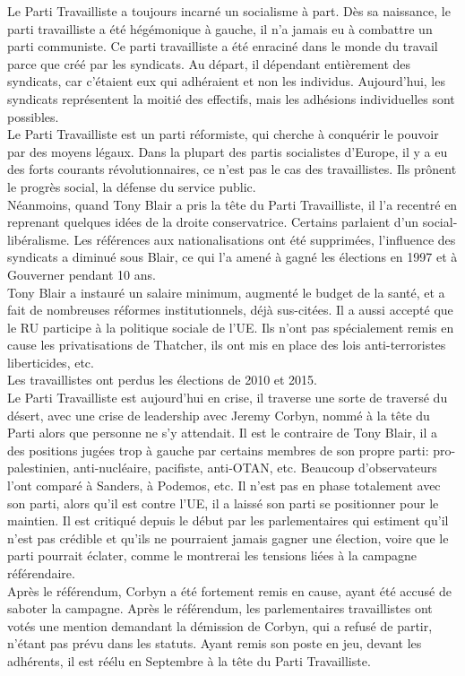 \documentclass[10pt, a4paper, openany]{book}
\begin{document}
Le Parti Travailliste a toujours incarné un socialisme à part. Dès sa naissance, le parti travailliste a été hégémonique à gauche, il n'a jamais eu à combattre un parti communiste. Ce parti travailliste a été enraciné dans le monde du travail parce que créé par les syndicats. Au départ, il dépendant entièrement des syndicats, car c'étaient eux qui adhéraient et non les individus. Aujourd'hui, les syndicats représentent la moitié des effectifs, mais les adhésions individuelles sont possibles. \\
Le Parti Travailliste est un parti réformiste, qui cherche à conquérir le pouvoir par des moyens légaux. Dans la plupart des partis socialistes d'Europe, il y a eu des forts courants révolutionnaires, ce n'est pas le cas des travaillistes. Ils prônent le progrès social, la défense du service public. \\
Néanmoins, quand Tony Blair a pris la tête du Parti Travailliste, il l'a recentré en reprenant quelques idées de la droite conservatrice. Certains parlaient d'un social-libéralisme. Les références aux nationalisations ont été supprimées, l'influence des syndicats a diminué sous Blair, ce qui l'a amené à gagné les élections en 1997 et à Gouverner pendant 10 ans. \\
Tony Blair a instauré un salaire minimum, augmenté le budget de la santé, et a fait de nombreuses réformes institutionnels, déjà sus-citées. Il a aussi accepté que le RU participe à la politique sociale de l'UE. Ils n'ont pas spécialement remis en cause les privatisations de Thatcher, ils ont mis en place des lois anti-terroristes liberticides, etc. \\
Les travaillistes ont perdus les élections de 2010 et 2015. \\
Le Parti Travailliste est aujourd'hui en crise, il traverse une sorte de traversé du désert, avec une crise de leadership avec Jeremy Corbyn, nommé à la tête du Parti alors que personne ne s'y attendait. Il est le contraire de Tony Blair, il a des positions jugées trop à gauche par certains membres de son propre parti: pro-palestinien, anti-nucléaire, pacifiste, anti-OTAN, etc. Beaucoup d'observateurs l'ont comparé à Sanders, à Podemos, etc. Il n'est pas en phase totalement avec son parti, alors qu'il est contre l'UE, il a laissé son parti se positionner pour le maintien. Il est critiqué depuis le début par les parlementaires qui estiment qu'il n'est pas crédible et qu'ils ne pourraient jamais gagner une élection, voire que le parti pourrait éclater, comme le montrerai les tensions liées à la campagne référendaire. \\
Après le référendum, Corbyn a été fortement remis en cause, ayant été accusé de saboter la campagne. Après le référendum, les parlementaires travaillistes ont votés une mention demandant la démission de Corbyn, qui a refusé de partir, n'étant pas prévu dans les statuts. Ayant remis son poste en jeu, devant les adhérents, il est réélu en Septembre à la tête du Parti Travailliste. 
\end{document}
